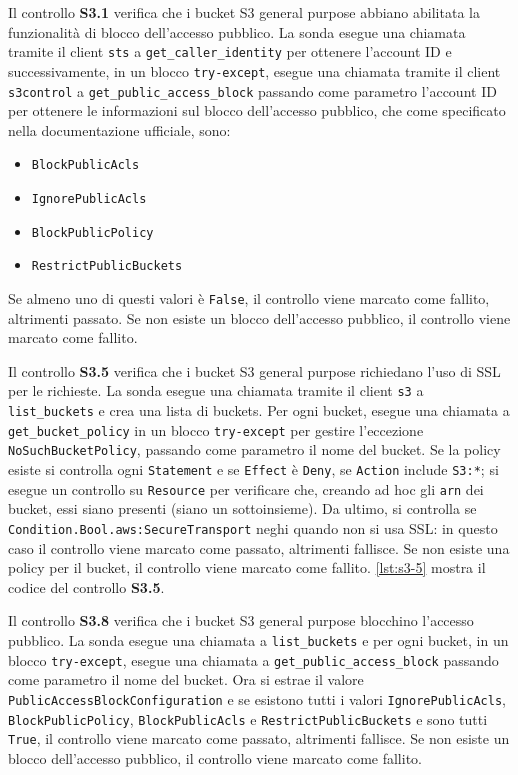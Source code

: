 Il controllo \textbf{S3.1} verifica che i bucket S3 general purpose abbiano abilitata la funzionalità di blocco dell'accesso pubblico. La sonda esegue una chiamata tramite il client \texttt{sts} a \texttt{get\_caller\_identity} per ottenere l'account ID e successivamente, in un blocco \texttt{try-except}, esegue una chiamata tramite il client \texttt{s3control} a \texttt{get\_public\_access\_block} passando come parametro l'account ID per ottenere le informazioni sul blocco dell'accesso pubblico, che come specificato nella documentazione ufficiale, sono:
\begin{itemize}
    \item \texttt{BlockPublicAcls}
    \item \texttt{IgnorePublicAcls}
    \item \texttt{BlockPublicPolicy}
    \item \texttt{RestrictPublicBuckets}
\end{itemize}
Se almeno uno di questi valori è \texttt{False}, il controllo viene marcato come fallito, altrimenti passato. Se non esiste un blocco dell'accesso pubblico, il controllo viene marcato come fallito.

Il controllo \textbf{S3.5} verifica che i bucket S3 general purpose richiedano l'uso di SSL per le richieste. La sonda esegue una chiamata tramite il client \texttt{s3} a \texttt{list\_buckets} e crea una lista di buckets. Per ogni bucket, esegue una chiamata a \texttt{get\_bucket\_policy} in un blocco \texttt{try-except} per gestire l'eccezione \texttt{NoSuchBucketPolicy}, passando come parametro il nome del bucket. Se la policy esiste si controlla ogni \texttt{Statement} e se \texttt{Effect} è \texttt{Deny}, se \texttt{Action} include \texttt{S3:*}; si esegue un controllo su \texttt{Resource} per verificare che, creando ad hoc gli \texttt{arn} dei bucket, essi siano presenti (siano un sottoinsieme). Da ultimo, si controlla se \texttt{Condition.Bool.aws:SecureTransport} neghi quando non si usa SSL: in questo caso il controllo viene marcato come passato, altrimenti fallisce. Se non esiste una policy per il bucket, il controllo viene marcato come fallito. \ref{lst:s3-5} mostra il codice del controllo \textbf{S3.5}.

Il controllo \textbf{S3.8} verifica che i bucket S3 general purpose blocchino l'accesso pubblico. La sonda esegue una chiamata a \texttt{list\_buckets} e per ogni bucket, in un blocco \texttt{try-except}, esegue una chiamata a \texttt{get\_public\_access\_block} passando come parametro il nome del bucket. Ora si estrae il valore \texttt{PublicAccessBlockConfiguration} e se esistono tutti i valori \texttt{IgnorePublicAcls}, \texttt{BlockPublicPolicy}, \texttt{BlockPublicAcls} e \texttt{RestrictPublicBuckets} e sono tutti \texttt{True}, il controllo viene marcato come passato, altrimenti fallisce. Se non esiste un blocco dell'accesso pubblico, il controllo viene marcato come fallito.


